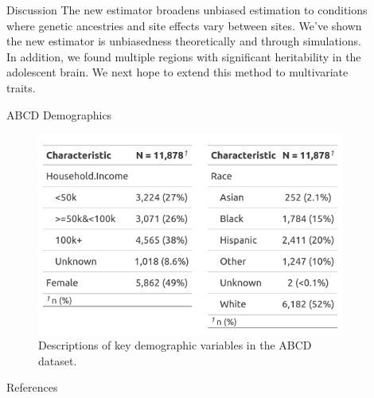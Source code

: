 \documentclass[final]{beamer}
\newlength{\sepwid}
\newlength{\onecolwid}
\newlength{\twocolwid}
\begin{document}
\begin{frame}[t]
\begin{columns}[t]
\begin{column}{\twocolwid}
\end{column} %
\begin{column}{\sepwid}\end{column} %
\begin{column}{\onecolwid} %
\begin{block}{Discussion}
The new estimator broadens unbiased estimation to conditions where genetic ancestries and site effects vary between sites. We've shown the new estimator is unbiasedness theoretically and through simulations. In addition, we found multiple regions with significant heritability in the adolescent brain. We next hope to extend this method to multivariate traits.
\end{block}

\vspace{3cm}

\begin{block}{ABCD Demographics}
\begin{figure}
    \centering
    \includegraphics[width = 1\textwidth]{Graphics/Table1.png}
    \caption{Descriptions of key demographic variables in the ABCD dataset.
}
    \label{tab:table}
\end{figure}
\end{block}



\begin{block}{References}
	\begin{tiny}
		
		
	\end{tiny}
\end{block}


\end{column}
\end{columns}
\end{frame}
\end{document}
